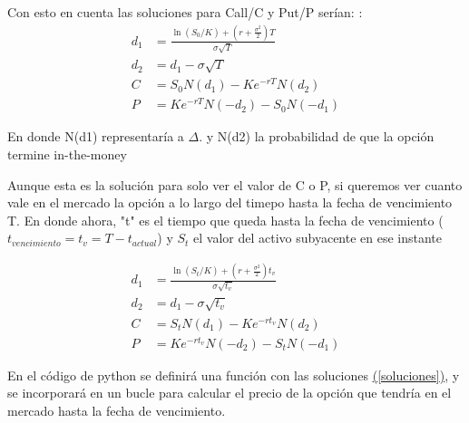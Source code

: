 \documentclass[11pt]{article}
\newcommand{\comillas}[1]{"#1"} %
\begin{document}
				Con esto en cuenta las soluciones para Call/C y Put/P serían: \cite{hull2016options}:
				\begin{equation}
					\boxed{
					\begin{aligned}
						d_1 &= \frac{\ln(S_0 / K) + (r + \frac{\sigma^2}{2})T}{\sigma\sqrt{T}} \\
						d_2 &= d_1 - \sigma\sqrt{T} \\
						C &= S_0 N(d_1) - K e^{-rT} N(d_2) \\
						P &= K e^{-rT} N(-d_2) - S_0 N(-d_1)
					\end{aligned}
					}
				\end{equation}
				
				En donde N(d1) representaría a $\Delta$. y N(d2) la probabilidad de que la opción termine in-the-money
				
				Aunque esta es la solución para solo ver el valor de C o P, si queremos ver cuanto vale en el mercado la opción a lo largo del timepo hasta la fecha de vencimiento T. En donde ahora, \comillas{t} es el tiempo que queda hasta la fecha de vencimiento ($t_{vencimiento} = t_v = T - t_{actual}$) y $S_t$ el valor del activo subyacente en ese instante
				
				\begin{equation}
					\boxed{
						\begin{aligned}
							d_1 &= \frac{\ln(S_t / K) + (r + \frac{\sigma^2}{2})t_v}{\sigma\sqrt{t_v}} \\
							d_2 &= d_1 - \sigma\sqrt{t_v} \\
							C &= S_t N(d_1) - K e^{-rt_v} N(d_2) \\
							P &= K e^{-rt_v} N(-d_2) - S_t N(-d_1)
						\end{aligned}
					}
					\label{soluciones}
				\end{equation}
				
				En el código de python se definirá una función con las soluciones \hyperref[soluciones]{(\ref{soluciones})}, y se incorporará en un bucle para calcular el precio de la opción que tendría en el mercado hasta la fecha de vencimiento.
			
\end{document}
